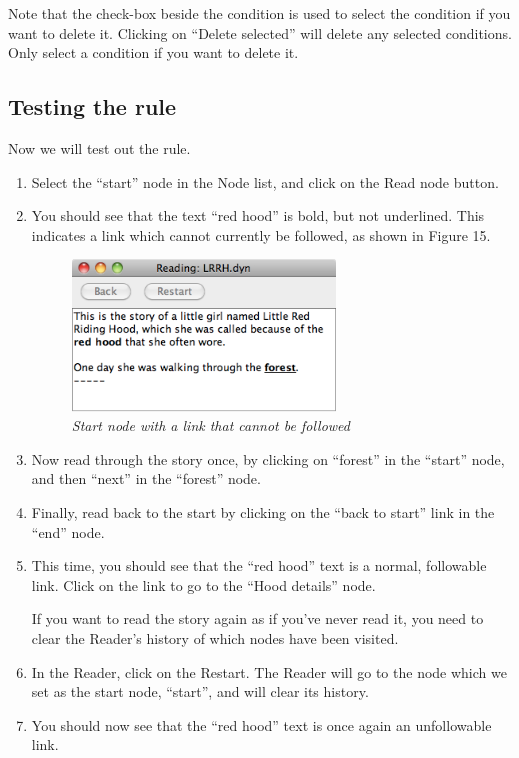 \documentclass{article}
\begin{document}
Note that the check-box beside the condition is used to select the condition if you
want to delete it. Clicking on ``Delete selected'' will delete any selected
conditions. Only select a condition if you want to delete it.


\subsection{Testing the rule}

Now we will test out the rule.

\begin{enumerate}
  \item Select the ``start'' node in the Node list, and click on the Read node button.
  \item You should see that the text ``red hood'' is bold, but not underlined.
  This indicates a link which cannot currently be followed, as shown in Figure 15.

 
\begin{figure}[ht]
  \centering
  \includegraphics[width=7cm]{images/hypedyn-tutorial-1-figure-15}
  \caption{\textit{Start node with a link that cannot be followed}}
\end{figure} 

\item Now read through the story once, by clicking on ``forest'' in the
``start'' node, and then ``next'' in the ``forest'' node.
\item Finally, read back to the start by clicking on the ``back to start'' link
in the ``end'' node.
\item This time, you should see that the ``red hood'' text is a normal,
followable link. Click on the link to go to the ``Hood details'' node.

If you want to read the story again as if you've never read it, you need to
clear the Reader's history of which nodes have been visited.

\item In the Reader, click on the Restart. The Reader will go to the node which
we set as the start node, ``start'', and will clear its history.
\item You should now see that the ``red hood'' text is once again an
unfollowable link.
\end{enumerate}
\end{document}
